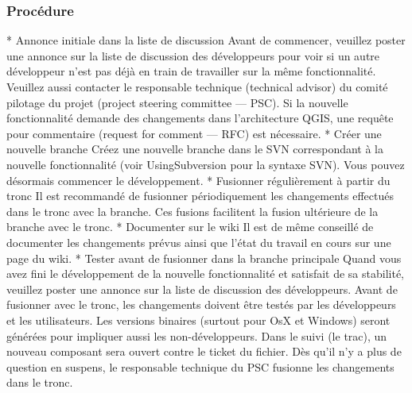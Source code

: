 \subsubsection{Procédure}
 * Annonce initiale dans la liste de discussion
 Avant de commencer, veuillez poster une annonce sur la liste de discussion des développeurs pour voir si un autre développeur n'est pas déjà en train de travailler sur la même fonctionnalité. Veuillez aussi contacter le responsable technique (technical advisor) du comité pilotage du projet (project steering committee --- PSC). Si la nouvelle fonctionnalité demande des changements dans l'architecture QGIS, une requête pour commentaire (request for comment --- RFC) est nécessaire.
 * Créer une nouvelle branche
Créez une nouvelle branche dans le SVN correspondant à la nouvelle fonctionnalité (voir UsingSubversion pour la syntaxe SVN). Vous pouvez désormais commencer le développement. 
 * Fusionner régulièrement à partir du tronc
Il est recommandé de fusionner périodiquement les changements effectués dans le tronc avec la branche. Ces fusions facilitent la fusion ultérieure de la branche avec le tronc.%
 * Documenter sur le wiki
Il est de même conseillé de documenter les changements prévus ainsi que l'état du travail en cours sur une page du wiki.
 * Tester avant de fusionner dans la branche principale
Quand vous avez fini le développement de la nouvelle fonctionnalité et satisfait de sa stabilité, veuillez poster une annonce sur la liste de discussion des développeurs. Avant de fusionner avec le tronc, les changements doivent être testés par les développeurs et les utilisateurs. Les versions binaires (surtout pour OsX et Windows) seront générées pour impliquer aussi les non-développeurs. Dans le suivi (le trac), un nouveau composant sera ouvert contre le ticket du fichier. Dès qu'il n'y a plus de question en suspens, le responsable technique du PSC fusionne les changements dans le tronc.

